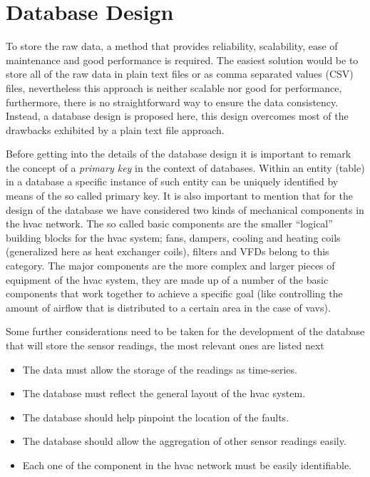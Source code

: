 \section{Database Design}
\label{section:databaseDesign}

To store the raw data, a method that provides reliability, scalability, ease of maintenance and good performance is required. The easiest solution would be to store all of the raw data in plain text files or as comma separated values (CSV) files, nevertheless this approach is neither scalable nor good for performance, furthermore, there is no straightforward way to ensure the data consistency. Instead, a database design is proposed here, this design overcomes most of the drawbacks exhibited by a plain text file approach. 

Before getting into the details of the database design it is important to remark the concept of a \textit{primary key} in the context of databases. Within an entity (table) in a database a specific instance of such entity can be uniquely identified by means of the so called primary key. It is also important to mention that for the design of the database we have considered two kinds of mechanical components in the \gls{hvac} network. The so called basic components are the smaller ``logical'' building blocks for the \gls{hvac} system; fans, dampers, cooling and heating coils (generalized here as heat exchanger coils), filters and VFDs belong to this category. The major components are the more complex and larger pieces of equipment of the \gls{hvac} system, they are made up of a number of the basic components that work together to achieve a specific goal (like controlling the amount of airflow that is distributed to a certain area in the case of \glspl{vav}).

Some further considerations need to be taken for the development of the database that will store the sensor readings, the most relevant ones are listed next

\begin{itemize}
\item The data must allow the storage of the readings as time-series.
\item The database must reflect the general layout of the \gls{hvac} system.
\item The database should help pinpoint the location of the faults.
\item The database should allow the aggregation of other sensor readings easily.
\item Each one of the component in the \gls{hvac} network must be easily identifiable.
\end{itemize}

